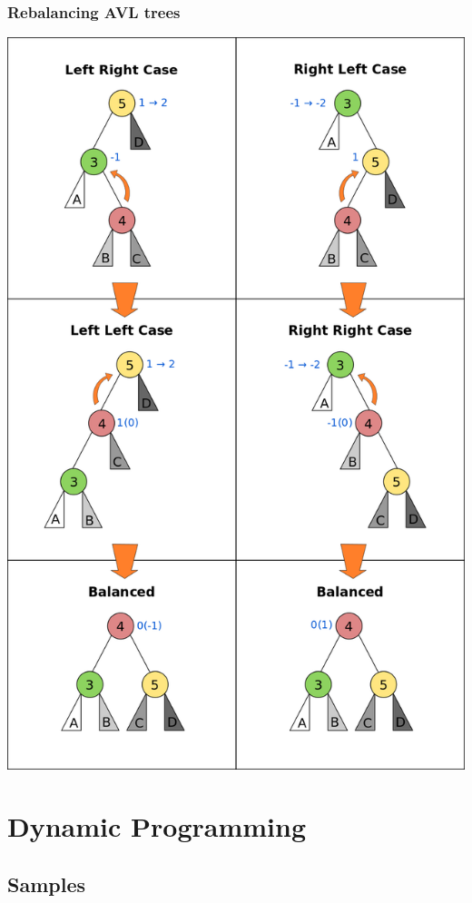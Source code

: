 \documentclass[9pt,landscape,a4paper, table]{extarticle}
\begin{document}
\begin{multicols*}{3}
\subsubsection{Rebalancing AVL trees}
{
\hspace{1cm}\includegraphics[angle=90,width = 1\linewidth]{img/AVL_Tree_Rebalancing.png}
}

\section{Dynamic Programming}

\subsection{Samples}


\end{multicols*}
\end{document}
